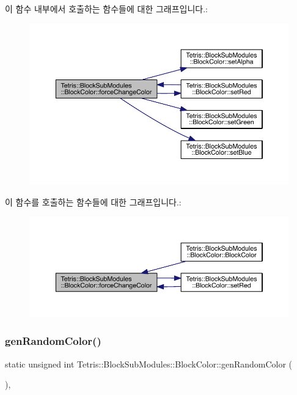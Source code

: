 이 함수 내부에서 호출하는 함수들에 대한 그래프입니다.\+:
\nopagebreak
\begin{figure}[H]
\begin{center}
\leavevmode
\includegraphics[width=350pt]{class_tetris_1_1_block_sub_modules_1_1_block_color_ae6d640629b11d880ca994923657adbe1_cgraph}
\end{center}
\end{figure}
이 함수를 호출하는 함수들에 대한 그래프입니다.\+:
\nopagebreak
\begin{figure}[H]
\begin{center}
\leavevmode
\includegraphics[width=350pt]{class_tetris_1_1_block_sub_modules_1_1_block_color_ae6d640629b11d880ca994923657adbe1_icgraph}
\end{center}
\end{figure}
\mbox{\label{class_tetris_1_1_block_sub_modules_1_1_block_color_a74374a6d24cd77c7f4fe03e19111bab7}} 
\subsubsection{\texorpdfstring{gen\+Random\+Color()}{genRandomColor()}}
{\footnotesize\ttfamily static unsigned int Tetris\+::\+Block\+Sub\+Modules\+::\+Block\+Color\+::gen\+Random\+Color (\begin{DoxyParamCaption}{ }\end{DoxyParamCaption})\hspace{0.3cm}{\ttfamily [inline]}, {\ttfamily [static]}}



